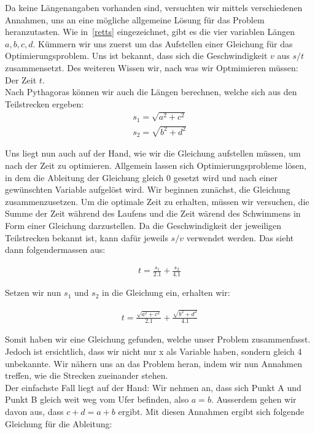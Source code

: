 \documentclass[10pt]{article}         %
\begin{document}
Da keine Längenangaben vorhanden sind, versuchten wir mittels verschiedenen Annahmen, uns an eine mögliche allgemeine Lösung für das Problem heranzutasten. Wie in~\ref{retts} eingezeichnet, gibt es die vier variablen Längen $a, b, c, d$. Kümmern wir uns zuerst um das Aufstellen einer Gleichung für das Optimierungsproblem. Uns ist bekannt, dass sich die Geschwindigkeit $v$ aus $s/t$ zusammensetzt. Des weiteren Wissen wir, nach was wir Optmimieren müssen: Der Zeit $t$. \\
Nach Pythagoras können wir auch die Längen berechnen, welche sich aus den Teilstrecken ergeben:
\begin{align}
    s_1=\sqrt{a^2+c^2} \\
    s_2=\sqrt{b^2+d^2}
\end{align}

Uns liegt nun auch auf der Hand, wie wir die Gleichung aufstellen müssen, um nach der Zeit zu optimieren. Allgemein lassen sich Optimierungsprobleme lösen, in dem die Ableitung der Gleichung gleich 0 gesetzt wird und nach einer gewünschten Variable aufgelöst wird. Wir beginnen zunächst, die Gleichung zusammenzusetzen. Um die optimale Zeit zu erhalten, müssen wir versuchen, die Summe der Zeit während des Laufens und die Zeit wärend des Schwimmens in Form einer Gleichung darzustellen. Da die Geschwindigkeit der jeweiligen Teilstrecken bekannt ist, kann dafür jeweils $s/v$ verwendet werden. Das sieht dann folgendermassen aus:

\begin{align}
    t = \frac{s_1}{2.1} + \frac{s_2}{4.1}
\end{align}

Setzen wir nun $s_1$ und $s_2$ in die Gleichung ein, erhalten wir:

\begin{align}
    t = \frac{\sqrt{a^2+c^2}}{2.1} + \frac{\sqrt{b^2+d^2}}{4.1}
\end{align}

Somit haben wir eine Gleichung gefunden, welche unser Problem zusammenfasst. Jedoch ist ersichtlich, dass wir nicht nur x als Variable haben, sondern gleich 4 unbekannte. Wir nähern uns an das Problem heran, indem wir nun Annahmen treffen, wie die Strecken zueinander stehen. \\
Der einfachste Fall liegt auf der Hand: Wir nehmen an, dass sich Punkt A und Punkt B gleich weit weg vom Ufer befinden, also $a=b$. Ausserdem gehen wir davon aus, dass $c+d=a+b$ ergibt. Mit diesen Annahmen ergibt sich folgende Gleichung für die Ableitung:
\end{document}
